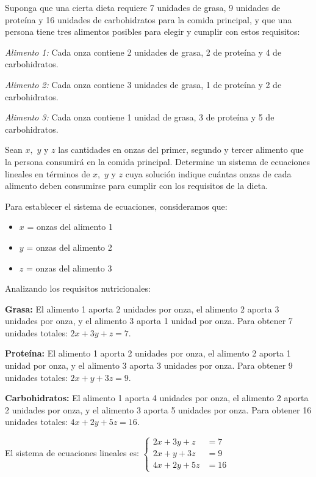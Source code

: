 \begin{prob}
Suponga que una cierta dieta requiere 7 unidades de grasa, 9 unidades de proteína y 16 unidades de carbohidratos para la comida principal, y que una persona tiene tres alimentos posibles para elegir y cumplir con estos requisitos:

\textit{Alimento 1:} Cada onza contiene 2 unidades de grasa, 2 de proteína y 4 de carbohidratos.

\textit{Alimento 2:} Cada onza contiene 3 unidades de grasa, 1 de proteína y 2 de carbohidratos.

\textit{Alimento 3:} Cada onza contiene 1 unidad de grasa, 3 de proteína y 5 de carbohidratos.

Sean $x,$ $y$ y $z$ las cantidades en onzas del primer, segundo y tercer alimento que la persona consumirá en la comida principal. Determine un sistema de ecuaciones lineales en términos de $x,$ $y$ y $z$ cuya solución indique cuántas onzas de cada alimento deben consumirse para cumplir con los requisitos de la dieta.

\begin{myproof}
Para establecer el sistema de ecuaciones, consideramos que:
\begin{itemize}
\item $x$ = onzas del alimento 1
\item $y$ = onzas del alimento 2
\item $z$ = onzas del alimento 3
\end{itemize}

Analizando los requisitos nutricionales:

\textbf{Grasa:} El alimento 1 aporta 2 unidades por onza, el alimento 2 aporta 3 unidades por onza, y el alimento 3 aporta 1 unidad por onza. Para obtener 7 unidades totales: $2x + 3y + z = 7.$

\textbf{Proteína:} El alimento 1 aporta 2 unidades por onza, el alimento 2 aporta 1 unidad por onza, y el alimento 3 aporta 3 unidades por onza. Para obtener 9 unidades totales: $2x + y + 3z = 9.$

\textbf{Carbohidratos:} El alimento 1 aporta 4 unidades por onza, el alimento 2 aporta 2 unidades por onza, y el alimento 3 aporta 5 unidades por onza. Para obtener 16 unidades totales: $4x + 2y + 5z = 16.$

El sistema de ecuaciones lineales es:  $\begin{cases}
2x + 3y + z &= 7\\
2x + y + 3z &= 9\\
4x + 2y + 5z &= 16
\end{cases}$


\end{myproof}
\end{prob}
